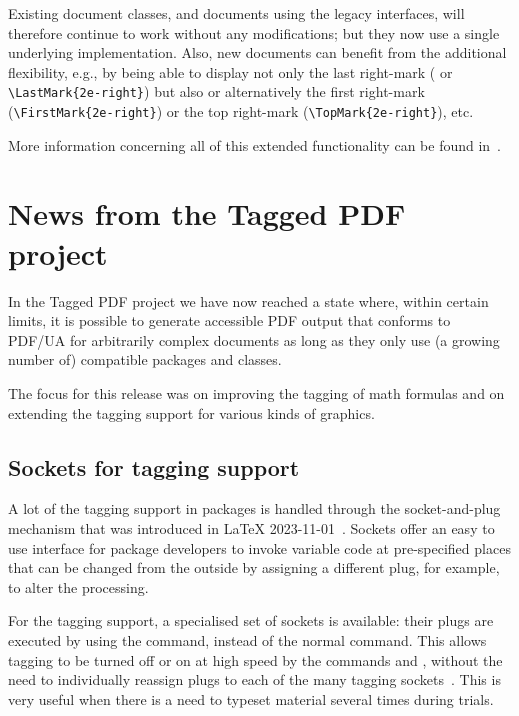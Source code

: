 \documentclass{ltnews}
\begin{document}
Existing document classes, and documents using the legacy interfaces,
will therefore continue to work without any modifications; but they
now use a single underlying implementation. Also, new documents can
benefit from the additional flexibility, e.g., by being able to
display not only the last right-mark ( or
\verb=\LastMark{2e-right}=) but also or alternatively the first
right-mark (\verb=\FirstMark{2e-right}=) or the top right-mark
(\verb=\TopMark{2e-right}=), etc.

More information concerning all of this extended functionality can be
found in~\cite{41:ltmarks}.


\section{News from the Tagged PDF project}

In the Tagged PDF project we have now reached a state where, within
certain limits, it is possible to generate accessible PDF output that
conforms to PDF/UA for arbitrarily complex documents as long as they
only use (a growing number of) compatible packages and classes.

The focus for this release was on improving the tagging of math
formulas and on extending the tagging support for various kinds of
graphics.

\subsection{Sockets for tagging support}

A lot of the tagging support in packages is handled through the socket-and-plug 
mechanism that was introduced in \LaTeX{}
2023-11-01~\cite{41:ltnews38}.
%
Sockets offer an easy to use interface
for package developers to invoke variable code at pre-specified places that
can be changed from the outside by assigning a different plug, for example, to alter the processing.


For the tagging support, a specialised set of sockets is available: 
their plugs are executed
by using the   command, instead of the normal
 command. This allows tagging to be turned off or on at high
speed by the commands  and , without the need
to individually reassign plugs to each of the many tagging
sockets~\cite{41:ltnews39}. This is very useful 
when there is a need to typeset material several times during trials. 
\end{document}
